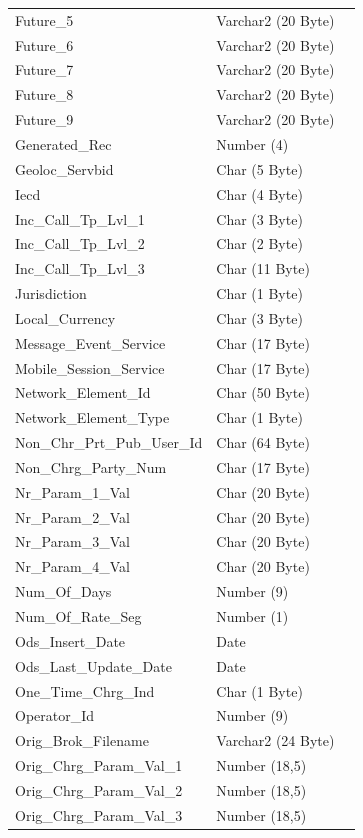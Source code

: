 \documentclass[12pt,twoside]{article}
\begin{document}
\begin{longtable}{l|l|l}
Future\_5 & Varchar2 (20 Byte) & \\
Future\_6 & Varchar2 (20 Byte) & \\
Future\_7 & Varchar2 (20 Byte) & \\
Future\_8 & Varchar2 (20 Byte) & \\
Future\_9 & Varchar2 (20 Byte) & \\
Generated\_Rec & Number (4) & \\
Geoloc\_Servbid & Char (5 Byte) & \\
Iecd & Char (4 Byte) & \\
Inc\_Call\_Tp\_Lvl\_1 & Char (3 Byte) & \\
Inc\_Call\_Tp\_Lvl\_2 & Char (2 Byte) & \\
Inc\_Call\_Tp\_Lvl\_3 & Char (11 Byte) & \\
Jurisdiction & Char (1 Byte) & \\
Local\_Currency & Char (3 Byte) & \\
Message\_Event\_Service & Char (17 Byte) & \\
Mobile\_Session\_Service & Char (17 Byte) & \\
Network\_Element\_Id & Char (50 Byte) & \\
Network\_Element\_Type & Char (1 Byte) & \\
Non\_Chr\_Prt\_Pub\_User\_Id & Char (64 Byte) & \\
Non\_Chrg\_Party\_Num & Char (17 Byte) & \\
Nr\_Param\_1\_Val & Char (20 Byte) & \\
Nr\_Param\_2\_Val & Char (20 Byte) & \\
Nr\_Param\_3\_Val & Char (20 Byte) & \\
Nr\_Param\_4\_Val & Char (20 Byte) & \\
Num\_Of\_Days & Number (9) & \\
Num\_Of\_Rate\_Seg & Number (1) & \\
Ods\_Insert\_Date & Date & \\
Ods\_Last\_Update\_Date & Date & \\
One\_Time\_Chrg\_Ind & Char (1 Byte) & \\
Operator\_Id & Number (9) & \\
Orig\_Brok\_Filename & Varchar2 (24 Byte) & \\
Orig\_Chrg\_Param\_Val\_1 & Number (18,5) & \\
Orig\_Chrg\_Param\_Val\_2 & Number (18,5) & \\
Orig\_Chrg\_Param\_Val\_3 & Number (18,5) & \\

\end{longtable}
\end{document}

